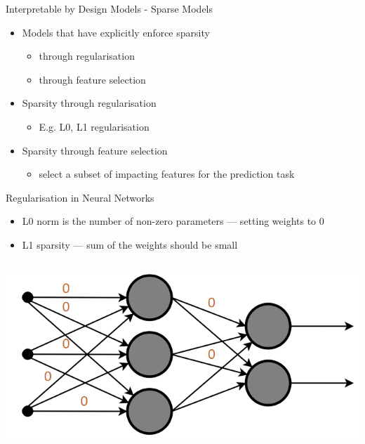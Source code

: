 \documentclass[11pt,compress,t,notes=noshow, aspectratio=169, xcolor=table]{beamer}
\begin{document}
\begin{frame}[c]{Interpretable by Design Models - Sparse Models}
\begin{itemize}
    \item Models that have explicitly enforce sparsity
    \begin{itemize}
        \item through regularisation
        \item through feature selection
    \end{itemize}
    \bigskip
    \item Sparsity through regularisation
    \begin{itemize}
        \item E.g. L0, L1 regularisation
    \end{itemize}
    \bigskip
    \item Sparsity through feature selection
    \begin{itemize}
        \item select a subset of impacting features for the prediction task
    \end{itemize}
\end{itemize}
    
\end{frame}

\begin{frame}{Regularisation in Neural Networks}
\begin{itemize}
    \item L0 norm is the number of non-zero parameters — setting weights to 0
    \item L1 sparsity — sum of the weights should be small
\end{itemize}

$$
$$
\centerline{\includegraphics[width=0.5\linewidth]{bild3}}

\end{frame}
\end{document}
